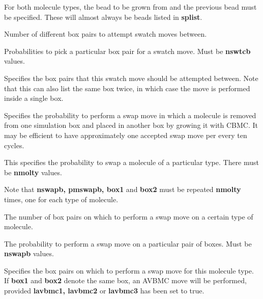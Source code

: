 \documentclass[12pt,letterpaper]{article}
\begin{document}
 For both molecule types, the
bead to be grown from and the previous bead must be specified.  These
will almost always be beads listed in {\textbf {splist}}.

 Number of different box pairs to attempt swatch
moves between.

 Probabilities to pick a particular box pair for
a swatch move.  Must be {\textbf {nswtcb}} values.

 Specifies the box pairs that this swatch move
should be attempted between.  Note that this can also list the same
box twice, in which case the move is performed inside a single box.

 Specifies the probability to perform a swap
move in which a molecule is removed from one simulation box and placed 
in another box by growing it with CBMC.  It may be efficient to have approximately
one accepted swap move per every ten cycles.

 This specifies the probability to swap a molecule of 
a particular type.  There must be {\textbf{nmolty}} values.

\noindent Note that {\textbf{nswapb, pmswapb, box1}} and {\textbf{box2}} must be
repeated {\textbf{nmolty}} times, one for each type of molecule.

 The number of box pairs on which to perform a swap
move on a certain type of molecule.  

 The probability to perform a swap move on a
particular pair of boxes.  Must be {\textbf {nswapb}} values.

 Specifies the box pairs on which to perform a swap
move for this molecule type.  If {\textbf{box1}} and {\textbf{box2}} denote the same box, 
an AVBMC move will be performed, provided {\textbf {lavbmc1, lavbmc2}} 
or {\textbf {lavbmc3}} has been set to true.
\end{document}

